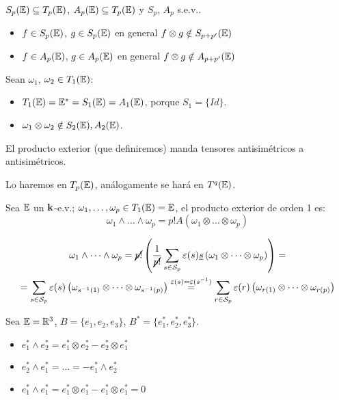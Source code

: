 \begin{obs}
	$S_p(\mathbb{E}) \subseteq T_p(\mathbb{E})$, $A_p(\mathbb{E}) \subseteq T_p(\mathbb{E})$ y $S_p$, $A_p$ s.e.v..
	\begin{itemize}
	    \item $f \in S_p(\mathbb{E})$, $g \in S_p(\mathbb{E})$ en general $f \otimes g \notin S_{p+p'}(\mathbb{E})$
	    \item $f \in A_p(\mathbb{E})$, $g \in A_p(\mathbb{E})$ en general $f \otimes g \notin A_{p+p'}(\mathbb{E})$
	\end{itemize}
\end{obs}
\begin{example}
    Sean $\omega_1$, $\omega_2 \in T_1(\mathbb{E})$:
	\begin{itemize}
		\item $T_1(\mathbb{E}) = \mathbb{E}^* = S_1(\mathbb{E}) = A_1(\mathbb{E})$, porque $S_1 = \{Id\}$.
		\item $\omega_1 \otimes \omega_2 \notin S_2(\mathbb{E}), A_2(\mathbb{E})$.
	\end{itemize}
\end{example}
\begin{obs}
	El producto exterior (que definiremos) manda tensores antisimétricos a antisimétricos.
\end{obs}
\begin{obs}
	Lo haremos en $T_p(\mathbb{E})$, análogamente se hará en $T^q(\mathbb{E})$.
\end{obs}
\begin{defi} \label{pr_ext}
	Sea $\mathbb{E}$ un $\mathbf{k}$-e.v.; $\omega_1, \dots, \omega_p \in T_1(\mathbb{E}) = \mathbb{E}$, el producto exterior de orden 1 es:
	\[
		\omega_1 \wedge \dots \wedge \omega_p = p! A(\omega_1 \otimes \dots \otimes \omega_p)
	\]
\end{defi}
\begin{obs} \label{obs_pr_ext}
	\begin{gather*}
		\omega_1 \wedge \dots \wedge \omega_p = \cancel{p!}  \left( \frac{1}{\cancel{p!}}\sum_{s \in \mathcal{S}_p} \varepsilon(s)
		\underline{s}\left(\omega_1 \otimes \dots \otimes \omega_p \right) \right) = \\
		= \sum_{s \in \mathcal{S}_p} \varepsilon(s) \left( \omega_{s^{-1}(1)} \otimes \dots \otimes \omega_{s^{-1}(p)} 
		\right) \stackrel{\varepsilon(s) = \varepsilon(s^{-1})}{=} \sum_{r \in \mathcal{S}_p} 
		\varepsilon(r) \left( \omega_{r(1)} \otimes \dots \otimes \omega_{r(p)} \right)
	\end{gather*}
\end{obs}
\begin{example}
    Sea $\mathbb{E} = \mathbb{R}^3$, $B = \{e_1, e_2, e_3\}$, $B^* = \{ e_1^*, e_2^*, e_3^*\}$.
    \begin{itemize}
        \item $e_1^* \wedge e_2^* = e_1^* \otimes e_2^* - e_2^* \otimes e_1^*$
        \item $e_2^* \wedge e_1^* = \dots = -e_1^* \wedge e_2^*$
        \item $e_1^* \wedge e_1^* = e_1^* \otimes e_1^* - e_1^* \otimes e_1^* = 0$
    \end{itemize}
\end{example}

